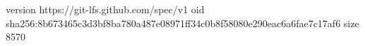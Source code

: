 version https://git-lfs.github.com/spec/v1
oid sha256:8b673465c3d3bf8ba780a487e08971ff34c0b8f58080e290eac6a6fae7c17af6
size 8570
